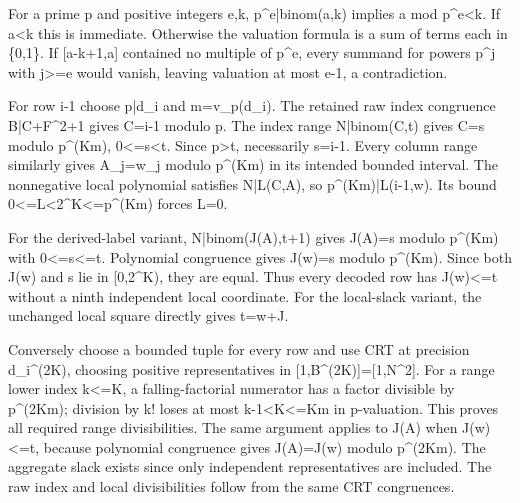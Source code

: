 For a prime p and positive integers e,k, p\textasciicircum{}\allowbreak{}e|binom(a,k) implies a mod p\textasciicircum{}\allowbreak{}e\textless{}\allowbreak{}k. If a\textless{}\allowbreak{}k this is immediate. Otherwise the valuation formula is a sum of terms each in \{0,1\}. If [a-k+\allowbreak{}1,a] contained no multiple of p\textasciicircum{}\allowbreak{}e, every summand for powers p\textasciicircum{}\allowbreak{}j with j\textgreater{}\allowbreak{}=\allowbreak{}e would vanish, leaving valuation at most e-1, a contradiction.



For row i-1 choose p|d\_\allowbreak{}i and m=\allowbreak{}v\_\allowbreak{}p(d\_\allowbreak{}i). The retained raw index congruence B|C+\allowbreak{}F\textasciicircum{}\allowbreak{}2+\allowbreak{}1 gives C=\allowbreak{}i-1 modulo p. The index range N|binom(C,t) gives C=\allowbreak{}s modulo p\textasciicircum{}\allowbreak{}(Km), 0\textless{}\allowbreak{}=\allowbreak{}s\textless{}\allowbreak{}t. Since p\textgreater{}\allowbreak{}t, necessarily s=\allowbreak{}i-1. Every column range similarly gives A\_\allowbreak{}j=\allowbreak{}w\_\allowbreak{}j modulo p\textasciicircum{}\allowbreak{}(Km) in its intended bounded interval. The nonnegative local polynomial satisfies N|L(C,A), so p\textasciicircum{}\allowbreak{}(Km)|L(i-1,w). Its bound 0\textless{}\allowbreak{}=\allowbreak{}L\textless{}\allowbreak{}2\textasciicircum{}\allowbreak{}K\textless{}\allowbreak{}=\allowbreak{}p\textasciicircum{}\allowbreak{}(Km) forces L=\allowbreak{}0.



For the derived-label variant, N|binom(J(A),t+\allowbreak{}1) gives J(A)=\allowbreak{}s modulo p\textasciicircum{}\allowbreak{}(Km) with 0\textless{}\allowbreak{}=\allowbreak{}s\textless{}\allowbreak{}=\allowbreak{}t. Polynomial congruence gives J(w)=\allowbreak{}s modulo p\textasciicircum{}\allowbreak{}(Km). Since both J(w) and s lie in [0,2\textasciicircum{}\allowbreak{}K), they are equal. Thus every decoded row has J(w)\textless{}\allowbreak{}=\allowbreak{}t without a ninth independent local coordinate. For the local-slack variant, the unchanged local square directly gives t=\allowbreak{}w+\allowbreak{}J.



Conversely choose a bounded tuple for every row and use CRT at precision d\_\allowbreak{}i\textasciicircum{}\allowbreak{}(2K), choosing positive representatives in [1,B\textasciicircum{}\allowbreak{}(2K)]=\allowbreak{}[1,N\textasciicircum{}\allowbreak{}2]. For a range lower index k\textless{}\allowbreak{}=\allowbreak{}K, a falling-factorial numerator has a factor divisible by p\textasciicircum{}\allowbreak{}(2Km); division by k! loses at most k-1\textless{}\allowbreak{}K\textless{}\allowbreak{}=\allowbreak{}Km in p-valuation. This proves all required range divisibilities. The same argument applies to J(A) when J(w)\textless{}\allowbreak{}=\allowbreak{}t, because polynomial congruence gives J(A)=\allowbreak{}J(w) modulo p\textasciicircum{}\allowbreak{}(2Km). The aggregate slack exists since only independent representatives are included. The raw index and local divisibilities follow from the same CRT congruences.



